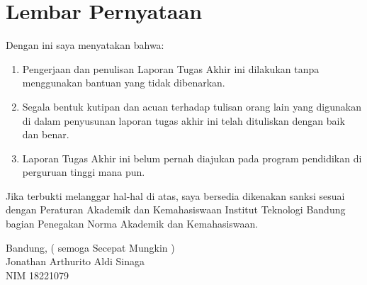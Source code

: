 \chapter*{Lembar Pernyataan}

Dengan ini saya menyatakan bahwa:

\begin{enumerate}

    \item Pengerjaan dan penulisan Laporan Tugas Akhir ini dilakukan tanpa menggunakan bantuan yang tidak dibenarkan.
    \item Segala bentuk kutipan dan acuan terhadap tulisan orang lain yang digunakan di dalam penyusunan laporan tugas akhir ini telah dituliskan dengan baik dan benar.
    \item Laporan Tugas Akhir ini belum pernah diajukan pada program pendidikan di perguruan tinggi mana pun.

\end{enumerate}

Jika terbukti melanggar hal-hal di atas, saya bersedia dikenakan sanksi sesuai
dengan Peraturan Akademik dan Kemahasiswaan Institut Teknologi Bandung bagian
Penegakan Norma Akademik dan Kemahasiswaan.
\vspace{15mm}

Bandung, ( semoga Secepat Mungkin ) \\
Jonathan Arthurito Aldi Sinaga \\
NIM 18221079
